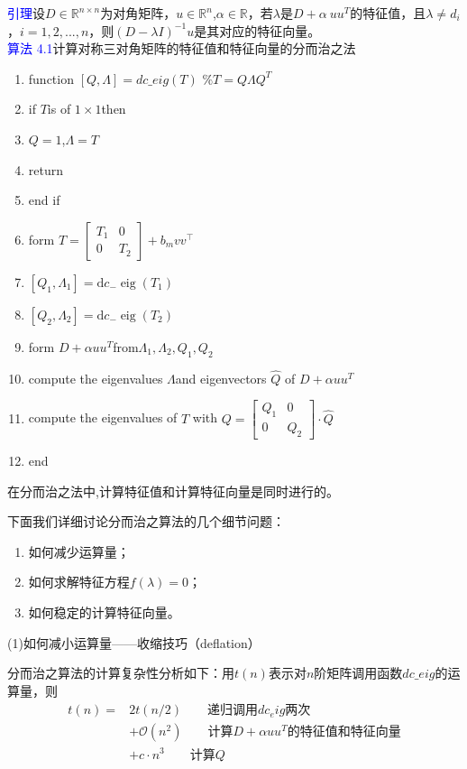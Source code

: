 \documentclass[12pt,a4paper]{article}
\begin{document}
\textcolor{blue}{引理}\quad 设$D\in \mathbb R^{n\times n}$为对角矩阵，$u\in \mathbb R^n$,$\alpha \in \mathbb R$，若$\lambda$是$D+\alpha\ uu^T$的特征值，且$\lambda \neq d_i$，$i=1,2,...,n$，则$(D-\lambda I)^{-1}u$是其对应的特征向量。\\
\textcolor{blue}{算法 4.1}\quad 计算对称三对角矩阵的特征值和特征向量的分而治之法
\begin{enumerate}[1:]
	\item function $[Q,\Lambda]=dc\_eig(T)$  \quad $\%T=Q\Lambda Q^T$
	\item if $T$is of $1\times 1$then
	\item \quad $Q=1$,$\Lambda=T$
	\item \quad return
	\item end if
	\item form $T=\left[\begin{array}{cc}{T_{1}} & {0} \\ {0} & {T_{2}}\end{array}\right]+b_{m} v v^{\top}
	$
	\item $\left[Q_{1}, \Lambda_{1}\right]=\mathrm{d} c_{-} \operatorname{eig}\left(T_{1}\right)$
	\item $\left[Q_{2}, \Lambda_{2}\right]=\mathrm{d} c_{-} \operatorname{eig}\left(T_{2}\right)$
	\item form $D+\alpha uu^T$from$\Lambda_{1},\Lambda_{2},Q_1,Q_2$
	\item compute the eigenvalues $\Lambda$and eigenvectors  $\hat{Q}$ of $D+\alpha uu^T$
	\item compute the eigenvalues of $T$ with $Q=\left[\begin{array}{cc}{Q_{1}} & {0} \\ {0} & {Q_{2}}\end{array}\right] \cdot \hat{Q}$
	\item end
\end{enumerate}

在分而治之法中,计算特征值和计算特征向量是同时进行的。

下面我们详细讨论分而治之算法的几个细节问题：
\begin{enumerate}[(1)]
	\item 如何减少运算量；
	\item 如何求解特征方程$f(\lambda)=0$；
	\item 如何稳定的计算特征向量。
\end{enumerate}
(1)如何减小运算量——收缩技巧（deflation）

分而治之算法的计算复杂性分析如下：用$t(n)$表示对$n$阶矩阵调用函数$dc\_eig$的运算量，则
\begin{equation*}
	\begin{aligned}
		t(n)=&2t(n/2)\qquad \mbox{递归调用}dc_eig\mbox{两次}\\&+\mathcal{O}(n^2)\qquad  \mbox{计算}D+\alpha uu^T \mbox{的特征值和特征向量}\\&+c·n^3 \qquad \mbox{计算}Q
	\end{aligned}
\end{equation*}
\end{document}
